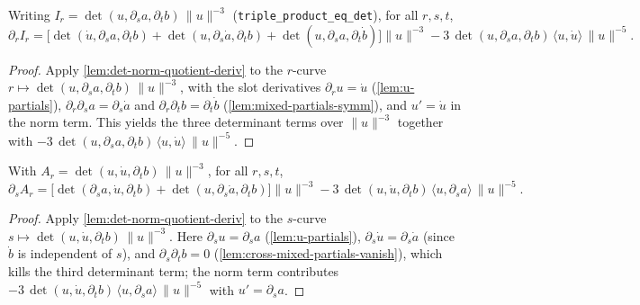 \begin{lemma}
    \label{lem:deformed-I-r-partial}
    Writing $I_r=\det(u,\partial_s a,\partial_t b)\,\lVert u\rVert^{-3}$
    (\texttt{triple\_product\_eq\_det}), for all $r,s,t$,
    \[
        \partial_r I_r =
        \bigl[\det(\dot u,\partial_s a,\partial_t b)
              +\det(u,\partial_s\dot a,\partial_t b)
              +\det(u,\partial_s a,\partial_t\dot b)\bigr]\lVert u\rVert^{-3}
        -3\,\det(u,\partial_s a,\partial_t b)\,\langle u,\dot u\rangle\,\lVert u\rVert^{-5}.
    \]
\end{lemma}
\begin{proof}
    Apply \cref{lem:det-norm-quotient-deriv} to the $r$-curve
    $r\mapsto\det(u,\partial_s a,\partial_t b)\,\lVert u\rVert^{-3}$, with the slot
    derivatives $\partial_r u=\dot u$ (\cref{lem:u-partials}),
    $\partial_r\partial_s a=\partial_s\dot a$ and
    $\partial_r\partial_t b=\partial_t\dot b$ (\cref{lem:mixed-partials-symm}), and
    $u'=\dot u$ in the norm term. This yields the three determinant terms over
    $\lVert u\rVert^{-3}$ together with
    $-3\,\det(u,\partial_s a,\partial_t b)\,\langle u,\dot u\rangle\,\lVert u\rVert^{-5}$.
\end{proof}

\begin{lemma}
    \label{lem:deformed-A-s-partial}
    With $A_r=\det(u,\dot u,\partial_t b)\,\lVert u\rVert^{-3}$, for all $r,s,t$,
    \[
        \partial_s A_r =
        \bigl[\det(\partial_s a,\dot u,\partial_t b)
              +\det(u,\partial_s\dot a,\partial_t b)\bigr]\lVert u\rVert^{-3}
        -3\,\det(u,\dot u,\partial_t b)\,\langle u,\partial_s a\rangle\,\lVert u\rVert^{-5}.
    \]
\end{lemma}
\begin{proof}
    Apply \cref{lem:det-norm-quotient-deriv} to the $s$-curve
    $s\mapsto\det(u,\dot u,\partial_t b)\,\lVert u\rVert^{-3}$. Here
    $\partial_s u=\partial_s a$ (\cref{lem:u-partials}),
    $\partial_s\dot u=\partial_s\dot a$ (since $\dot b$ is independent of $s$), and
    $\partial_s\partial_t b=0$ (\cref{lem:cross-mixed-partials-vanish}), which kills
    the third determinant term; the norm term contributes
    $-3\,\det(u,\dot u,\partial_t b)\,\langle u,\partial_s a\rangle\,\lVert u\rVert^{-5}$
    with $u'=\partial_s a$.
\end{proof}

